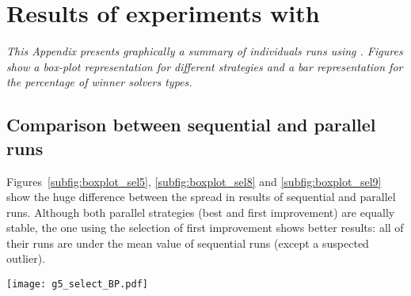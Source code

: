 \chapter{Results of experiments with \sgp}
\label{app:sgp}
\textit{This Appendix presents graphically a summary of individuals runs using \sgp. Figures show a \textit{box-plot} representation for different strategies and a bar representation for the percentage of winner solvers types.}
\vfill
\newpage

\section{Comparison between sequential and parallel runs}

%

\begin{minipage}[c]{0.50\textwidth}
Figures~\ref{subfig:boxplot_sel5}, \ref{subfig:boxplot_sel8} and \ref{subfig:boxplot_sel9} show the huge difference between the spread in results of sequential and parallel runs. Although both parallel strategies (best and first improvement) are equally stable, the one using the selection \om{} of first improvement shows better results: all of their runs are under the mean value of sequential runs (except a suspected outlier).
\end{minipage}\hspace{0.05\textwidth}
\begin{minipage}[c]{0.40\textwidth}
\centering
\texttt{[image: g5\_select\_BP.pdf]}
\label{subfig:boxplot_sel5}
\end{minipage}


